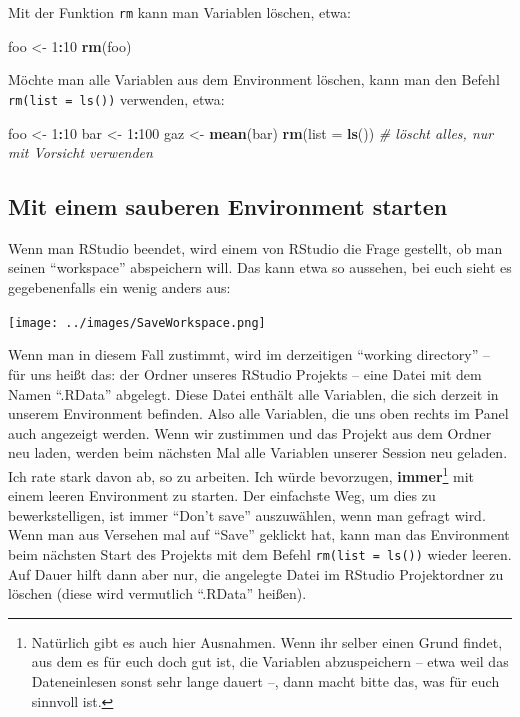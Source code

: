 \documentclass[12pt,]{tufte-book}
\newenvironment{Shaded}{\begin{snugshade}}{\end{snugshade}}
\newcommand{\KeywordTok}[1]{\textcolor[rgb]{0.13,0.29,0.53}{\textbf{#1}}}
\newcommand{\DataTypeTok}[1]{\textcolor[rgb]{0.13,0.29,0.53}{#1}}
\newcommand{\DecValTok}[1]{\textcolor[rgb]{0.00,0.00,0.81}{#1}}
\newcommand{\StringTok}[1]{\textcolor[rgb]{0.31,0.60,0.02}{#1}}
\newcommand{\CommentTok}[1]{\textcolor[rgb]{0.56,0.35,0.01}{\textit{#1}}}
\newcommand{\OperatorTok}[1]{\textcolor[rgb]{0.81,0.36,0.00}{\textbf{#1}}}
\newcommand{\NormalTok}[1]{#1}
\theoremstyle{definition}
\theoremstyle{definition}
\theoremstyle{definition}
\theoremstyle{remark}
\begin{document}
Mit der Funktion \texttt{rm} kann man Variablen löschen, etwa:

\begin{Shaded}
\begin{Highlighting}[]
\NormalTok{foo <-}\StringTok{ }\DecValTok{1}\OperatorTok{:}\DecValTok{10}
\KeywordTok{rm}\NormalTok{(foo)}
\end{Highlighting}
\end{Shaded}

Möchte man alle Variablen aus dem Environment löschen, kann man den
Befehl \texttt{rm(list\ =\ ls())} verwenden, etwa:

\begin{Shaded}
\begin{Highlighting}[]
\NormalTok{foo <-}\StringTok{ }\DecValTok{1}\OperatorTok{:}\DecValTok{10}
\NormalTok{bar <-}\StringTok{ }\DecValTok{1}\OperatorTok{:}\DecValTok{100}
\NormalTok{gaz <-}\StringTok{ }\KeywordTok{mean}\NormalTok{(bar)}
\KeywordTok{rm}\NormalTok{(}\DataTypeTok{list =} \KeywordTok{ls}\NormalTok{()) }\CommentTok{# löscht alles, nur mit Vorsicht verwenden}
\end{Highlighting}
\end{Shaded}

\subsection{Mit einem sauberen Environment
starten}\label{mit-einem-sauberen-environment-starten}

Wenn man RStudio beendet, wird einem von RStudio die Frage gestellt, ob
man seinen ``workspace'' abspeichern will. Das kann etwa so aussehen,
bei euch sieht es gegebenenfalls ein wenig anders aus:

\texttt{[image: ../images/SaveWorkspace.png]}

Wenn man in diesem Fall zustimmt, wird im derzeitigen ``working
directory'' -- für uns heißt das: der Ordner unseres RStudio Projekts --
eine Datei mit dem Namen ``.RData'' abgelegt. Diese Datei enthält alle
Variablen, die sich derzeit in unserem Environment befinden. Also alle
Variablen, die uns oben rechts im Panel auch angezeigt werden. Wenn wir
zustimmen und das Projekt aus dem Ordner neu laden, werden beim nächsten
Mal alle Variablen unserer Session neu geladen. Ich rate stark davon ab,
so zu arbeiten. Ich würde bevorzugen, \textbf{immer}\footnote{Natürlich
  gibt es auch hier Ausnahmen. Wenn ihr selber einen Grund findet, aus
  dem es für euch doch gut ist, die Variablen abzuspeichern -- etwa weil
  das Dateneinlesen sonst sehr lange dauert --, dann macht bitte das,
  was für euch sinnvoll ist.} mit einem leeren Environment zu starten.
Der einfachste Weg, um dies zu bewerkstelligen, ist immer ``Don't save''
auszuwählen, wenn man gefragt wird. Wenn man aus Versehen mal auf
``Save'' geklickt hat, kann man das Environment beim nächsten Start des
Projekts mit dem Befehl \texttt{rm(list\ =\ ls())} wieder leeren. Auf
Dauer hilft dann aber nur, die angelegte Datei im RStudio Projektordner
zu löschen (diese wird vermutlich ``.RData'' heißen).


\end{document}
